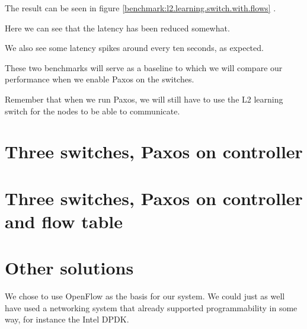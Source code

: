 The result can be seen in figure \ref{benchmark:l2.learning.switch.with.flows}
.

Here we can see that the latency has been reduced somewhat.

We also see some latency spikes around every ten seconds, as expected.


These two benchmarks will serve as a baseline to which we will compare our
performance when we enable Paxos on the switches.

Remember that when we run Paxos, we will still have to use the L2 learning
switch for the nodes to be able to communicate.


\section{Three switches, Paxos on controller}


\section{Three switches, Paxos on controller and flow table}


\section{Other solutions}

We chose to use OpenFlow as the basis for our system.
We could just as well have used a networking system that already supported
programmability in some way, for instance the Intel DPDK.

